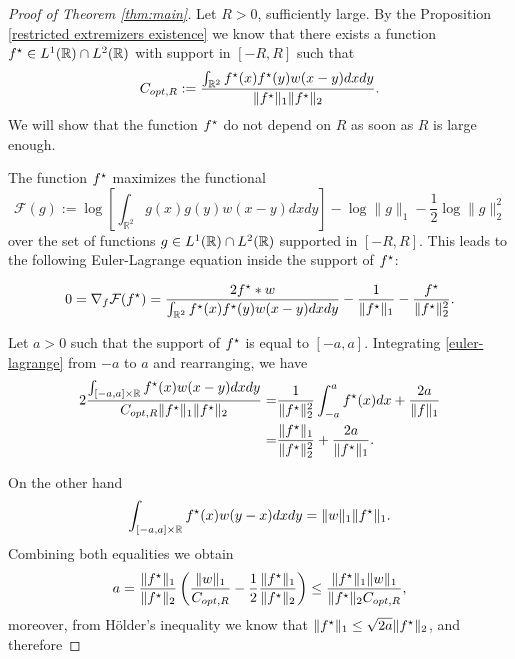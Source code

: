 	\begin{proof}[Proof of Theorem \ref{thm:main}]

Let $R>0$, sufficiently large. By the Proposition \ref{restricted extremizers existence} we know that there exists a function $f^\star\in L^{1}({\mathbb R})\cap L^{2}({\mathbb R})$ with support in $[-R,R]$ such that
\begin{equation}\label{opt constant R}
C_{opt,R}:=\frac{\int_{\mathbb R^2} f^\star(x)f^\star(y) w(x-y) dx dy }{\|f^\star\|_1\|f^\star\|_2}.
\end{equation}
We will show that the function $f^\star$ do not depend on $R$ as soon as $R$ is large enough.


	
	The function $f^\star$ maximizes the functional
	\begin{equation}
		\mathcal F (g) :=  \log \left[\int_{\mathbb R^2} g(x)g(y)w(x-y) dx dy \right]  -  \log \|g\|_1 - \frac 1 2 \log \|g\|_2^2
	\end{equation}
	over the set of functions $g\in L^{1}({\mathbb R})\cap L^{2}({\mathbb R})$ supported in $[-R,R]$. This leads to the following Euler-Lagrange equation inside the support of $f^\star$:

	\begin{equation}\label{euler-lagrange}
		0 = \nabla_f \mathcal F (f^\star) = \frac{2 f^\star\ast w}{\int_{\mathbb R^2} f^\star(x)f^\star(y) w(x-y) dx dy}  - \frac 1 {\|f^\star\|_1} - \frac{f^\star}{\|f^\star\|_2^2}.
	\end{equation}
	
	Let $a>0$ such that the support of $f^\star$ is equal to $[-a,a]$. Integrating \eqref{euler-lagrange} from $-a$ to $a$ and rearranging, we have
	\begin{align*}
	2 \frac{\int_{[-a,a]\times \mathbb R} f^\star(x) w(x-y) dxdy}
	{C_{opt,R}\|f^\star\|_1\|f^\star\|_2}
	=&
	\frac{1}{\|f^\star\|_2^2}\int_{-a}^{a}f^\star(x)dx+\frac{2a}{\|f\|_1} 
	\\=&  
	\frac{\|f^\star\|_1}{\|f^\star\|_2^2} + \frac{2a}{\|f^\star\|_1}.
	\end{align*}

	On the other hand
	$$
	\int_{[-a,a]\times \mathbb R} f^\star(x) w(y-x) dxdy = \|w\|_1\|f^\star\|_1.
	$$
	Combining both equalities we obtain
	\begin{equation}
	\label{eq:support_bound_coarse}
	a = \frac{\|f^\star\|_1}{\|f^\star\|_2} \left (\frac{\|w\|_1}{C_{opt,R}} - \frac 1 2 \frac{\|f^\star\|_1}{\|f^\star\|_2} \right ) \le \frac{\|f^\star\|_1 \|w\|_1 }{\|f^\star\|_2C_{opt,R}},
	\end{equation}
	moreover, from H\"older's inequality we know that ${\|f^\star\|_1} \le \sqrt{2a} {\|f^\star\|_2}$, and therefore


\end{proof}
